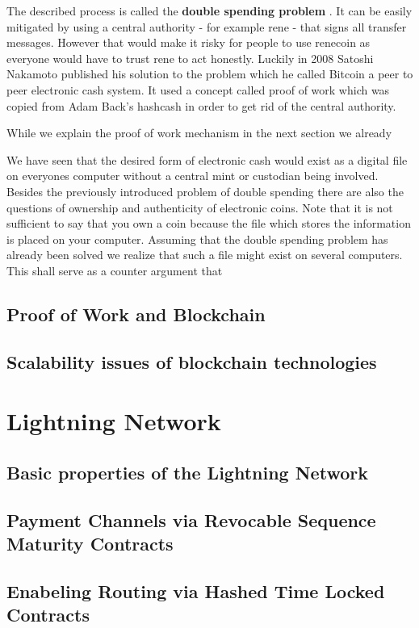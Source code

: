 \documentclass[ebook,12pt,oneside,openany]{memoir}
\begin{document}
The described process is called the \textbf{double spending problem} .
It can be easily mitigated by using a central authority - for example rene - that signs all transfer messages.
However that would make it risky for people to use renecoin as everyone would have to trust rene to act honestly.
Luckily in 2008 Satoshi Nakamoto published his solution to the problem which he called Bitcoin a peer to peer electronic cash system.
It used a concept called proof of work which was copied from Adam Back's hashcash in order to get rid of the central authority. 

While we explain the proof of work mechanism in the next section we already


We have seen that the desired form of electronic cash would exist as a digital file on everyones computer without a central mint or custodian being involved.
Besides the previously introduced problem of double spending there are also the questions of ownership and authenticity of electronic coins.
Note that it is not sufficient to say that you own a coin because the file which stores the information is placed on your computer.
Assuming that the double spending problem has already been solved we realize that such a file might exist on several computers.
This shall serve as a counter argument that 

\section{Proof of Work and Blockchain}

\section{Scalability issues of blockchain technologies}
\chapter{Lightning Network}
\section{Basic properties of the Lightning Network}
\section{Payment Channels via Revocable Sequence Maturity Contracts}
\section{Enabeling Routing via Hashed Time Locked Contracts}
\end{document}
